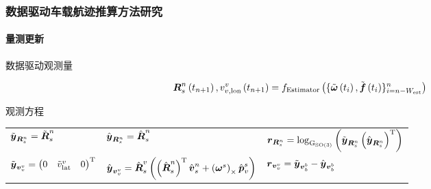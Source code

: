 \begin{frame}

	\frametitle{数据驱动车载航迹推算方法研究}	
	\framesubtitle{量测更新}
	
	{\small
		数据驱动观测量
		
		\begin{equation*}
			\label{eq:DataDrivenPedestrianMeasurementEstimator}
			\vb*{R}_{s}^{n}\left(t_{n+1}\right), v^{v}_{v, \mathrm{lon}}\left(t_{n+1}\right)
			=
			f_{\mathrm{Estimator}}\left(\{\tilde{\vb*{\omega}}\left(t_i\right), \tilde{\vb*{f}}\left(t_i\right)\}_{i = n-W_{\mathrm{est}}}^{n}\right)
		\end{equation*}
				
		观测方程
		
		\begin{center}
			\begin{tabular*}{\linewidth}{@{\extracolsep{\fill}}lll}
	            $ \tilde{\vb*{y}}_{\vb*{R}_s^n} = \tilde{\vb*{R}}_s^n $ 
	            & $ \hat{\vb*{y}}_{\vb*{R}_s^n} = \hat{\vb*{R}}_s^n $ 
	            & $ \vb*{r}_{\vb*{R}_s^n} = \log_{\mathrm{G}_{\mathrm{SO}\left(3\right)}}\left(\tilde{\vb*{y}}_{\vb*{R}_s^n}\left(\hat{\vb*{y}}_{\vb*{R}_s^n}\right)^{\mathrm{T}}\right) $ 
	            \\
	            $ \tilde{\vb*{y}}_{\vb*{v}_v^v} = 
	            \begin{pmatrix}
	           		0 & \tilde{v}_{\mathrm{lat}}^v & 0
	           	\end{pmatrix}^{\mathrm{T}} $ 
	            & $ \hat{\vb*{y}}_{\vb*{v}_v^v} = \hat{\vb*{R}}_s^v \left( \left(\hat{\vb*{R}}_s^n\right)^{\mathrm{T}} \hat{\vb*{v}}_s^n + \left(\vb*{\omega}^s\right)_{\times} \hat{\vb*{p}}_v^s \right) $ 
	            & $ \vb*{r}_{\vb*{v}_v^v} = \tilde{\vb*{y}}_{\vb*{v}_b^b} - \hat{\vb*{y}}_{\vb*{v}_b^b} $
	   		\end{tabular*}
   		\end{center}       
	}
 
\end{frame}

